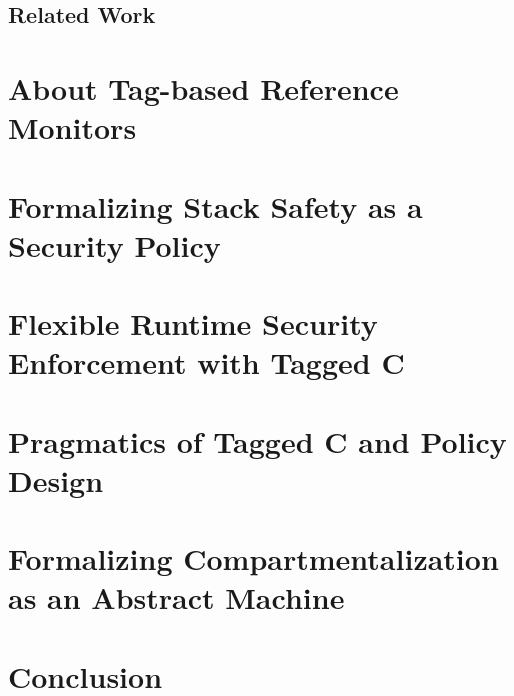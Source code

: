 \documentclass{report}
\begin{document}
\section{Related Work}

\chapter{About Tag-based Reference Monitors}
\label{ch:background}

\chapter{Formalizing Stack Safety as a Security Policy}
\label{ch:stacksafety}

\chapter{Flexible Runtime Security Enforcement with Tagged C}
\label{ch:taggedc}

\chapter{Pragmatics of Tagged C and Policy Design}
\label{ch:pragmatics}

\chapter{Formalizing Compartmentalization as an Abstract Machine}
\label{ch:compartments}

\chapter{Conclusion}
\end{document}
